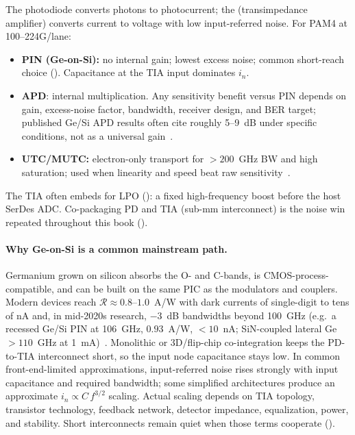 The photodiode converts photons to photocurrent; the 
(transimpedance amplifier) converts current to voltage with low input-referred noise.
For PAM4 at 100--224G/lane:

\begin{itemize}
\item \textbf{PIN (Ge-on-Si):} no internal gain; lowest excess noise; common
      short-reach choice (). Capacitance at the TIA input dominates
      $i_n$.
\item \textbf{APD}: internal multiplication. Any sensitivity benefit versus
      PIN depends on gain, excess-noise factor, bandwidth, receiver design, and BER
      target; published Ge/Si APD results often cite roughly 5--9~dB under specific
      conditions, not as a universal gain~\cite{apd}.
\item \textbf{UTC/MUTC:} electron-only transport for $>\!200$~GHz BW and high
      saturation; used when linearity and speed beat raw sensitivity~\cite{utc}.
\end{itemize}

The TIA often embeds  for LPO ():
a fixed high-frequency boost before the host SerDes ADC. Co-packaging PD and TIA
(sub-mm interconnect) is the noise win repeated throughout this book
().

\paragraph{Why Ge-on-Si is a common mainstream path.} Germanium grown on silicon
absorbs the O- and C-bands, is CMOS-process-compatible, and can be built on the
same PIC as the modulators and couplers. Modern devices reach
$\mathcal{R}\approx0.8$--$1.0$~A/W with dark currents of single-digit to tens of
nA and, in mid-2020s research, $-3$~dB bandwidths beyond 100~GHz (e.g.\ a recessed
Ge/Si PIN at 106~GHz, $0.93$~A/W, $<10$~nA; SiN-coupled lateral Ge $>110$~GHz at
1~mA)~\cite{gesipd}. Monolithic or 3D/flip-chip co-integration keeps the
PD-to-TIA interconnect short, so the input node capacitance stays low. In common
front-end-limited approximations, input-referred noise rises strongly with input
capacitance and required bandwidth; some simplified architectures produce an
approximate $i_n \!\propto\! C\,f^{3/2}$ scaling. Actual scaling depends on TIA
topology, transistor technology, feedback network, detector impedance,
equalization, power, and stability. Short interconnects remain quiet when those
terms cooperate ().

